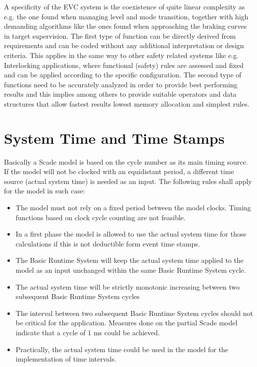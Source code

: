 \documentclass[oneside]{template/openetcs_report}
\begin{document}
A specificity  of the \gls{EVC} system is the coexistence of quite linear complexity as e.g. the one found when  managing level and mode transition, together with high demanding algorithms like the ones found when approaching the braking curves in target supervision. The first type of function can be directly derived from requirements and can be coded without any additional interpretation or design criteria. This applies in the same way to other safety related systems like e.g. Interlocking applications, where functional (safety) rules are assessed and fixed and can be applied according to the specific configuration. The second type of functions need to be accurately analyzed in order to provide best performing results and this implies among others to provide suitable operators and data structures that allow fastest results lowest memory allocation and simplest rules.


\section{System Time and Time Stamps}
Basically a Scade model is based on the cycle number as its main timing source.
If the model will not be clocked with an equidistant period, a different time source (actual system time) is
needed as an input. The following rules shall apply for the model in such case:

\begin{itemize}
\item The model must not rely on a fixed period between the model clocks. Timing functions based on clock cycle counting are not feasible.
\item In a first phase the model is allowed to use the actual system time for those calculations if this is not deductible form event time stamps.
\item The Basic Runtime System will keep the actual system time applied to the model as an input unchanged within the same Basic Runtime System cycle.
\item The actual system time will be strictly monotonic increasing between two subsequent Basic Runtime
System cycles 
\item The interval between two subsequent Basic Runtime System cycles should not be critical for the application. Measures done on the partial Scade model indicate that a cycle of 1 ms could be achieved.
\item Practically, the actual system time could be used in the model for the implementation of time intervals.
\end{itemize}
\end{document}
